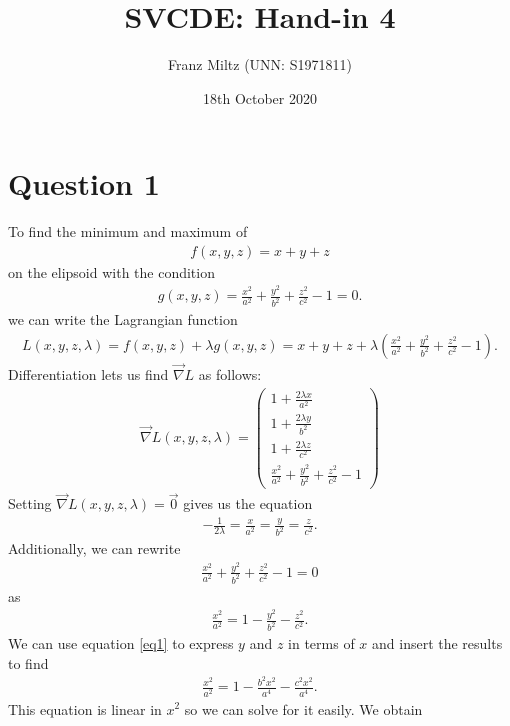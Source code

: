 \documentclass{article}
\newcommand{\grad}{\vec\nabla}
\begin{document}
\title{SVCDE: Hand-in 4}
\author{Franz Miltz (UNN: S1971811)}
\date{18th October 2020}
\maketitle
\section*{Question 1}
To find the minimum and maximum of
\begin{align*}
  f(x,y,z)=x + y + z
\end{align*}
on the elipsoid with the condition
\begin{align*}
  g(x,y,z)=\frac{x^2}{a^2} + \frac{y^2}{b^2} + \frac{z^2}{c^2}-1=0.
\end{align*}
we can write the Lagrangian function
\begin{align*}
  L(x,y,z,\lambda) = f(x,y,z)+\lambda g(x,y,z) =  x + y + z + \lambda\left(\frac{x^2}{a^2}+\frac{y^2}{b^2}+\frac{z^2}{c^2}-1\right).
\end{align*}
Differentiation lets us find $\grad L$ as follows:
\begin{align*}
  \grad L(x,y,z,\lambda)=\begin{pmatrix}
    1+\frac{2\lambda x}{a^2}\\
    1+\frac{2\lambda y}{b^2}\\
    1+\frac{2\lambda z}{c^2}\\
    \frac{x^2}{a^2}+\frac{y^2}{b^2}+\frac{z^2}{c^2}-1
  \end{pmatrix}
\end{align*}
Setting $\grad L(x,y,z,\lambda)=\vec 0$ gives us the equation
\begin{align}
  \label{eq1}
  -\frac{1}{2\lambda} = \frac{x}{a^2} = \frac{y}{b^2} = \frac{z}{c^2}.
\end{align}
Additionally, we can rewrite
\begin{align*}
  \frac{x^2}{a^2}+\frac{y^2}{b^2}+\frac{z^2}{c^2}-1=0
\end{align*}
as
\begin{align*}
  \frac{x^2}{a^2}=1-\frac{y^2}{b^2}-\frac{z^2}{c^2}.
\end{align*}
We can use equation \ref{eq1} to express $y$ and $z$ in terms of $x$ and
insert the results to find
\begin{align*}
  \frac{x^2}{a^2}=1-\frac{b^2x^2}{a^4}-\frac{c^2x^2}{a^4}.
\end{align*}
This equation is linear in $x^2$ so we can solve for it easily. We obtain
\end{document}
